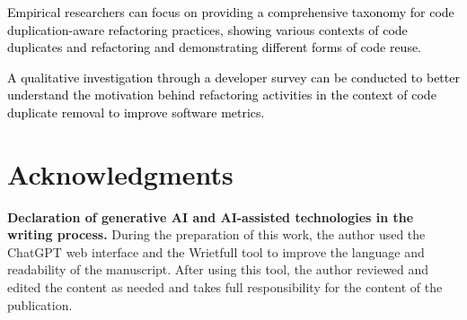\textemdash \textcolor{black}{Empirical researchers can focus on providing a comprehensive taxonomy for code duplication-aware refactoring practices, showing various contexts of code duplicates and refactoring and demonstrating different forms of code reuse.}

\textemdash \textcolor{black}{A qualitative investigation through a developer survey can be conducted to better understand the motivation behind refactoring activities in the context of code duplicate removal to improve software metrics.}






\section{Acknowledgments}
\noindent\textbf{Declaration of generative AI and AI-assisted technologies in the writing process.}
During the preparation of this work, the author used the ChatGPT web interface and the Wrietfull tool to improve the language and readability of the manuscript. After using this tool, the author reviewed and edited the content as needed and takes full responsibility for the content of the publication.